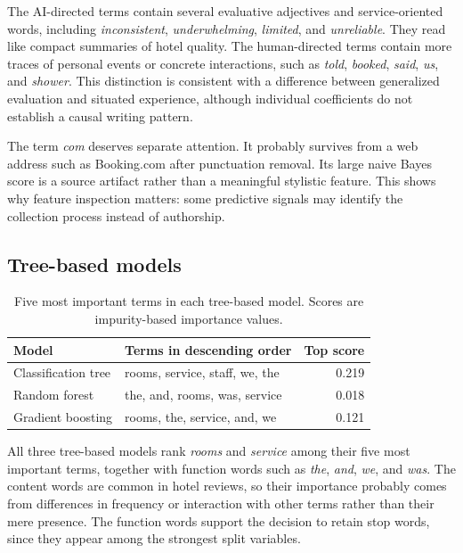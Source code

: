 \documentclass[onecolumn]{jmlr}
\begin{document}
The AI-directed terms contain several evaluative adjectives and service-oriented words, including \emph{inconsistent}, \emph{underwhelming}, \emph{limited}, and \emph{unreliable}. They read like compact summaries of hotel quality. The human-directed terms contain more traces of personal events or concrete interactions, such as \emph{told}, \emph{booked}, \emph{said}, \emph{us}, and \emph{shower}. This distinction is consistent with a difference between generalized evaluation and situated experience, although individual coefficients do not establish a causal writing pattern.

The term \emph{com} deserves separate attention. It probably survives from a web address such as Booking.com after punctuation removal. Its large naive Bayes score is a source artifact rather than a meaningful stylistic feature. This shows why feature inspection matters: some predictive signals may identify the collection process instead of authorship.

\subsection{Tree-based models}

\begin{table}[ht]
\centering
\caption{Five most important terms in each tree-based model. Scores are impurity-based importance values.}
\label{tab:tree-features}
\small
\begin{tabular}{llr}
\toprule
Model & Terms in descending order & Top score \\
\midrule
Classification tree & rooms, service, staff, we, the & 0.219 \\
Random forest & the, and, rooms, was, service & 0.018 \\
Gradient boosting & rooms, the, service, and, we & 0.121 \\
\bottomrule
\end{tabular}
\end{table}

All three tree-based models rank \emph{rooms} and \emph{service} among their five most important terms, together with function words such as \emph{the}, \emph{and}, \emph{we}, and \emph{was}. The content words are common in hotel reviews, so their importance probably comes from differences in frequency or interaction with other terms rather than their mere presence. The function words support the decision to retain stop words, since they appear among the strongest split variables.
\end{document}
